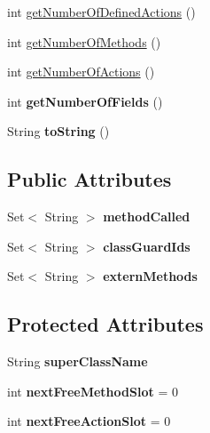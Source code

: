 \begin{DoxyCompactItemize}
\item 
int \hyperlink{classlime_1_1antlr4_1_1ClassSymbol_a2cbf5115ef39f615447ea46a777cbb9f}{get\+Number\+Of\+Defined\+Actions} ()
\item 
int \hyperlink{classlime_1_1antlr4_1_1ClassSymbol_a3f6bef449ae63455b81793f897a0c7e9}{get\+Number\+Of\+Methods} ()
\item 
int \hyperlink{classlime_1_1antlr4_1_1ClassSymbol_a2d505f3b8d3fe0727ff72b55195a3b6e}{get\+Number\+Of\+Actions} ()
\item 
\mbox{\label{classlime_1_1antlr4_1_1ClassSymbol_ae60eda30124bbcefd3adb0c694c7f3c4}} 
int {\bfseries get\+Number\+Of\+Fields} ()
\item 
\mbox{\label{classlime_1_1antlr4_1_1ClassSymbol_adc9fde793561674436cfd7c13ce61e93}} 
String {\bfseries to\+String} ()
\end{DoxyCompactItemize}
\subsection*{Public Attributes}
\begin{DoxyCompactItemize}
\item 
\mbox{\label{classlime_1_1antlr4_1_1ClassSymbol_a9f999815c2d73172a6cf39537646dc44}} 
Set$<$ String $>$ {\bfseries method\+Called}
\item 
\mbox{\label{classlime_1_1antlr4_1_1ClassSymbol_a680722e0d3e297093b3f731986491cf9}} 
Set$<$ String $>$ {\bfseries class\+Guard\+Ids}
\item 
\mbox{\label{classlime_1_1antlr4_1_1ClassSymbol_a705d66c00e52c5987258a7c5bc913e2d}} 
Set$<$ String $>$ {\bfseries extern\+Methods}
\end{DoxyCompactItemize}
\subsection*{Protected Attributes}
\begin{DoxyCompactItemize}
\item 
\mbox{\label{classlime_1_1antlr4_1_1ClassSymbol_a614bdac77f637b1a26d4dd77adec48de}} 
String {\bfseries super\+Class\+Name}
\item 
\mbox{\label{classlime_1_1antlr4_1_1ClassSymbol_a43628f8649fc6107ccb5dba1045e3f39}} 
int {\bfseries next\+Free\+Method\+Slot} = 0
\item 
\mbox{\label{classlime_1_1antlr4_1_1ClassSymbol_a1612136c011a497c79963acedc55308c}} 
int {\bfseries next\+Free\+Action\+Slot} = 0
\end{DoxyCompactItemize}


